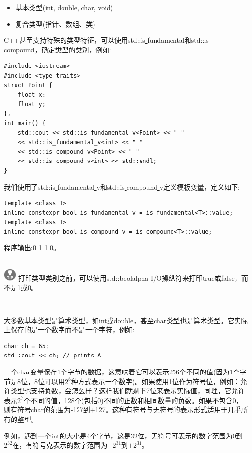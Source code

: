 \begin{itemize}
	\item 基本类型(int, double, char, void)
	\item 复合类型(指针、数组、类)
\end{itemize}

C++甚至支持特殊的类型特征，可以使用std::is\underline{ }fundamental和std::is\underline{ }compound，确定类型的类别，例如:\par

\begin{lstlisting}[caption={}]
#include <iostream>
#include <type_traits>
struct Point {
	float x;
	float y;
};
int main() {
	std::cout << std::is_fundamental_v<Point> << " "
	<< std::is_fundamental_v<int> << " "
	<< std::is_compound_v<Point> << " "
	<< std::is_compound_v<int> << std::endl;
}
\end{lstlisting}

我们使用了std::is\underline{ }fundamental\underline{ }v和std::is\underline{ }compound\underline{ }v定义模板变量，定义如下: \par

\begin{lstlisting}[caption={}]
template <class T>
inline constexpr bool is_fundamental_v = is_fundamental<T>::value;
template <class T>
inline constexpr bool is_compound_v = is_compound<T>::value;
\end{lstlisting}

程序输出:0 1 1 0。\par

\hspace*{\fill} \\ %
\includegraphics[width=0.05\textwidth]{images/tip}
打印类型类别之前，可以使用std::boolalpha I/O操纵符来打印true或false，而不是1或0。 \par
\noindent\textbf{}\ \par

大多数基本类型是算术类型，如int或double，甚至char类型也是算术类型。它实际上保存的是一个数字而不是一个字符，例如:\par

\begin{lstlisting}[caption={}]
char ch = 65;
std::cout << ch; // prints A
\end{lstlisting}

一个char变量保存1个字节的数据，这意味着它可以表示256个不同的值(因为1个字节是8位，8位可以用$2^8$种方式表示一个数字)。如果使用1位作为符号位，例如：允许类型也支持负数，会怎么样？这样我们就剩下7位来表示实际值，同理，它允许表示$2^7$个不同的值，128个(包括0)不同的正数和相同数量的负数。如果不包含0，则有符号char的范围为-127到+127。这种有符号与无符号的表示形式适用于几乎所有的整型。 \par
例如，遇到一个int的大小是4个字节，这是32位，无符号可表示的数字范围为0到$2^{32}$在，有符号克表示的数字范围为$-2^{31}$到$+2^{31}$。 \par

